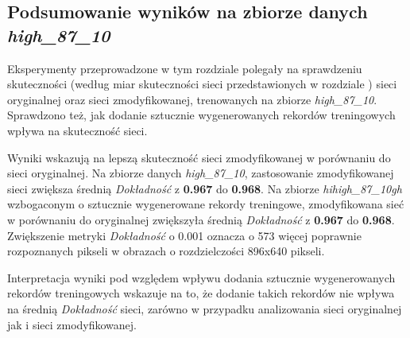 \subsection{Podsumowanie wyników na zbiorze danych \textit{high\_87\_10}}
Eksperymenty przeprowadzone w tym rozdziale polegały na sprawdzeniu skuteczności (według miar skuteczności sieci przedstawionych w rozdziale ) sieci oryginalnej oraz sieci zmodyfikowanej, trenowanych na zbiorze \textit{high\_87\_10}.
Sprawdzono też, jak dodanie sztucznie wygenerowanych rekordów treningowych wpływa na skuteczność sieci.


Wyniki wskazują na lepszą skuteczność sieci zmodyfikowanej w porównaniu do sieci oryginalnej.
Na zbiorze danych \textit{high\_87\_10}, zastosowanie zmodyfikowanej sieci zwiększa średnią \textit{Dokładność} z \textbf{0.967} do \textbf{0.968}.
Na zbiorze \textit{hihigh\_87\_10gh} wzbogaconym o sztucznie wygenerowane rekordy treningowe, zmodyfikowana sieć w porównaniu do oryginalnej zwiększyła średnią \textit{Dokładność} z \textbf{0.967} do \textbf{0.968}.
Zwiększenie metryki \textit{Dokładność} o 0.001 oznacza o 573 więcej poprawnie rozpoznanych pikseli w obrazach o rozdzielczości 896x640 pikseli.


Interpretacja wyniki pod względem wpływu dodania sztucznie wygenerowanych rekordów treningowych wskazuje na to, że dodanie takich rekordów nie wpływa na średnią \textit{Dokładność} sieci, zarówno w przypadku analizowania sieci oryginalnej jak i sieci zmodyfikowanej.
